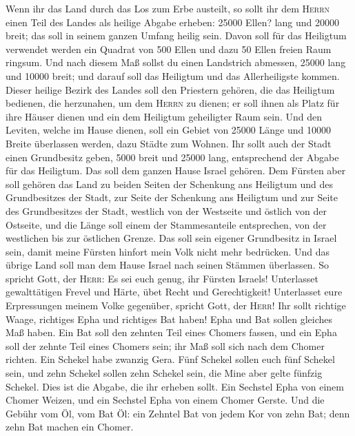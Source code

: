  Wenn ihr das Land durch das Los zum Erbe austeilt, so
sollt ihr dem \textsc{Herrn} einen Teil des Landes als heilige Abgabe
erheben: 25000 Ellen? lang und 20000 breit; das soll in seinem ganzen
Umfang heilig sein.  Davon soll für das Heiligtum
verwendet werden ein Quadrat von 500 Ellen und dazu 50 Ellen freien Raum
ringsum.  Und nach diesem Maß sollst du einen Landstrich
abmessen, 25000 lang und 10000 breit; und darauf soll das Heiligtum und
das Allerheiligste kommen.  Dieser heilige Bezirk des
Landes soll den Priestern gehören, die das Heiligtum bedienen, die
herzunahen, um dem \textsc{Herrn} zu dienen; er soll ihnen als Platz für
ihre Häuser dienen und ein dem Heiligtum geheiligter Raum sein.
 Und den Leviten, welche im Hause dienen, soll ein Gebiet
von 25000 Länge und 10000 Breite überlassen werden, dazu Städte zum
Wohnen.  Ihr sollt auch der Stadt einen Grundbesitz geben,
5000 breit und 25000 lang, entsprechend der Abgabe für das Heiligtum.
Das soll dem ganzen Hause Israel gehören.  Dem Fürsten
aber soll gehören das Land zu beiden Seiten der Schenkung ans Heiligtum
und des Grundbesitzes der Stadt, zur Seite der Schenkung ans Heiligtum
und zur Seite des Grundbesitzes der Stadt, westlich von der Westseite
und östlich von der Ostseite, und die Länge soll einem der
Stammesanteile entsprechen, von der westlichen bis zur östlichen Grenze.
 Das soll sein eigener Grundbesitz in Israel sein, damit
meine Fürsten hinfort mein Volk nicht mehr bedrücken. Und das übrige
Land soll man dem Hause Israel nach seinen Stämmen überlassen.
 So spricht Gott, der \textsc{Herr}: Es sei euch genug,
ihr Fürsten Israels! Unterlasset gewalttätigen Frevel und Härte, übet
Recht und Gerechtigkeit! Unterlasset eure Erpressungen meinem Volke
gegenüber, spricht Gott, der \textsc{Herr}!  Ihr sollt
richtige Waage, richtiges Epha und richtiges Bat haben! 
Epha und Bat sollen gleiches Maß haben. Ein Bat soll den zehnten Teil
eines Chomers fassen, und ein Epha soll der zehnte Teil eines Chomers
sein; ihr Maß soll sich nach dem Chomer richten.  Ein
Schekel habe zwanzig Gera. Fünf Schekel sollen euch fünf Schekel sein,
und zehn Schekel sollen zehn Schekel sein, die Mine aber gelte fünfzig
Schekel.  Dies ist die Abgabe, die ihr erheben sollt. Ein
Sechstel Epha von einem Chomer Weizen, und ein Sechstel Epha von einem
Chomer Gerste.  Und die Gebühr vom Öl, vom Bat Öl: ein
Zehntel Bat von jedem Kor von zehn Bat; denn zehn Bat machen ein Chomer.
